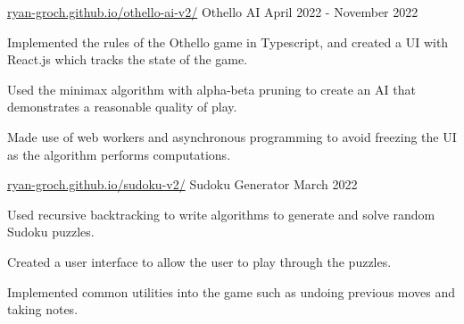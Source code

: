 \begin{cventries}
  \cventry
    {\href{https://ryan-groch.github.io/othello-ai-v2/}{ryan-groch.github.io/othello-ai-v2/}} %
    {Othello AI} %
    {April 2022 - November 2022} %
    {} %
    {
      \begin{cvitems} %
        \item {Implemented the rules of the Othello game in Typescript, and created a UI with React.js which tracks the state of the game.}
        \item {Used the minimax algorithm with alpha-beta pruning to create an AI that demonstrates a reasonable quality of play.}
        \item {Made use of web workers and asynchronous programming to avoid freezing the UI as the algorithm performs computations.}
      \end{cvitems}
    }

  \cventry
    {\href{https://ryan-groch.github.io/sudoku-v2/}{ryan-groch.github.io/sudoku-v2/}} %
    {Sudoku Generator} %
    {March 2022} %
    {} %
    {
      \begin{cvitems} %
        \item {Used recursive backtracking to write algorithms to generate and solve random Sudoku puzzles.}
        \item {Created a user interface to allow the user to play through the puzzles.}
        \item {Implemented common utilities into the game such as undoing previous moves and taking notes.}
      \end{cvitems}
    }


\end{cventries}

